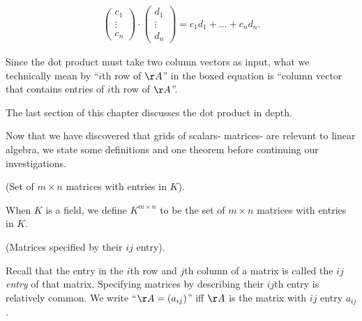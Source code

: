 \begin{theorem}
    \begin{align*}
        \begin{pmatrix} c_1 \\ \vdots \\ c_n \end{pmatrix}
        \cdot
        \begin{pmatrix} d_1 \\ \vdots \\ d_n \end{pmatrix}
        =
        c_1 d_1 + ... + c_n d_n.
    \end{align*}
    
    Since the dot product must take two column vectors as input, what we technically mean by ``$i$th row of $\AA$'' in the boxed equation is ``column vector that contains entries of $i$th row of $\AA$''.
    
    The last section of this chapter discusses the dot product in depth.
\end{theorem}

Now that we have discovered that grids of scalars- matrices- are relevant to linear algebra, we state some definitions and one theorem before continuing our investigations.

\begin{defn}
    (Set of $m \times n$ matrices with entries in $K$).
    
    When $K$ is a field, we define $K^{m \times n}$ to be the set of $m \times n$ matrices with entries in $K$.
\end{defn}

\begin{defn}
    (Matrices specified by their $ij$ entry).
    
    Recall that the entry in the $i$th row and $j$th column of a matrix is called the \textit{$ij$ entry} of that matrix. Specifying matrices by describing their $ij$th entry is relatively common. We write ``$\AA = (a_{ij})$'' iff $\AA$ is the matrix with $ij$ entry $a_{ij}$.
\end{defn}

